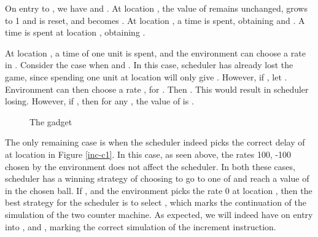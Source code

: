 \begin{enumerate}
 On entry to , we have  and . 
 At location , the value of  remains unchanged,  grows to 1 and is reset, 
and  becomes . At location , a 
time  is spent, obtaining  
and . A time 
is spent at location , obtaining . 


At location , a time of one unit is spent, and the environment can choose a rate in .
Consider the case when  and . In this case, scheduler 
has already lost the game, since spending one unit at location 
will only give . 
  However, if , 
let . Environment can then choose a rate , for .
Then . This would 
result in scheduler losing. However, if , then 
for any , the value of  is . 
    

\begin{figure}[h]
\begin{center}
\caption{The gadget }
\label{inc-c1-less}
\end{center}
\end{figure}

The only remaining case is when the scheduler indeed picks the correct delay of  
at location  in Figure \ref{inc-c1}. In this case, as seen above, 
the rates 100, -100 chosen by the environment does not affect the scheduler. 
In both these cases, scheduler has a winning strategy of choosing to go to 
one of  and reach a value of  in the chosen ball.  
If , and the environment picks the rate 0 at location , then 
the best strategy for the scheduler is to select  , which 
marks the continuation of the simulation of the two counter machine. 
As expected, we will indeed have on entry into ,  and ,
marking the correct simulation of the increment  instruction.
  

\end{enumerate}
